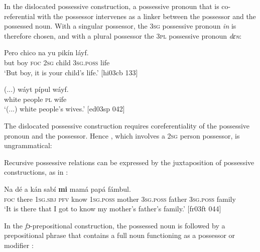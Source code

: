 In the dislocated possessive construction, a possessive pronoun that is co-referential with the possessor intervenes as a linker between the possessor and the possessed noun. With a singular possessor, the \textsc{3sg} possessive pronoun \textit{in} is therefore chosen, and with a plural possessor the \textsc{3pl} possessive pronoun \textit{dɛn}: 



\ea%
    \label{ex:key:238}
    \gll Pero    chico  na  yu  pikín      láyf.\\
but    boy    \textsc{foc}  \textsc{2sg}  child  \textsc{3sg.poss}  life\\

\glt ‘But boy, it is your child’s life.’ [hi03cb 133]
\z


\ea%
    \label{ex:key:239}
    \gll (...)  wáyt  pípul    wáyf.\\
{} white  people  \textsc{pl}  wife\\

\glt ‘(...) white people’s wives.’ [ed03sp 042]
\z

The dislocated possessive construction requires coreferentiality of the possessive pronoun and the possessor. Hence , which involves a \textsc{2sg} person possessor, is ungrammatical:


\z

Recursive possessive relations can be expressed by the juxtaposition of possessive constructions, as in : 


\ea%
    \label{ex:key:241}
    \gll Na  dé    a    kán  sabí    \textbf{mi}    mamá      papá
    fámbul. \\
\textsc{foc}  there  \textsc{1sg.sbj}  \textsc{pfv}  know  \textsc{1sg.poss}  mother  \textsc{3sg.poss}  father
\textsc{3sg.poss}  family\\

\glt ‘It is there that I got to know my mother’s father’s family.’ [fr03ft 044]
\z

In the \textit{fɔ}{}-prepositional construction, the possessed noun is followed by a prepositional phrase that contains a full noun functioning as a possessor  or modifier : 


